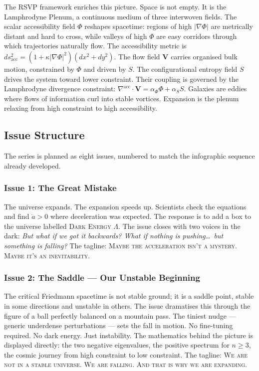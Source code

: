 \documentclass[12pt, a4paper]{article}
\begin{document}
The RSVP framework enriches this picture. Space is not empty. It is the Lamphrodyne Plenum, a continuous medium of three interwoven fields. The scalar accessibility field $\Phi$ reshapes spacetime: regions of high $|\nabla\Phi|$ are metrically distant and hard to cross, while valleys of high $\Phi$ are easy corridors through which trajectories naturally flow. The accessibility metric is $ds^2_{\text{acc}} = (1 + \kappa|\nabla\Phi|^2)(dx^2 + dy^2)$. The flow field $\mathbf{V}$ carries organised bulk motion, constrained by $\Phi$ and driven by $S$. The configurational entropy field $S$ drives the system toward lower constraint. Their coupling is governed by the Lamphrodyne divergence constraint: $\nabla^{\text{acc}} \cdot \mathbf{V} = \alpha_\Phi \Phi + \alpha_S S$. Galaxies are eddies where flows of information curl into stable vortices. Expansion is the plenum relaxing from high constraint to high accessibility.

\subsection{Issue Structure}

The series is planned as eight issues, numbered to match the infographic sequence already developed.

\subsubsection{Issue 1: The Great Mistake}

The universe expands. The expansion speeds up. Scientists check the equations and find $\ddot{a} > 0$ where deceleration was expected. The response is to add a box to the universe labelled \textsc{Dark Energy} $\Lambda$. The issue closes with two voices in the dark: \textit{But what if we got it backwards? What if nothing is pushing\ldots\ but something is falling?} The tagline: \textsc{Maybe the acceleration isn't a mystery. Maybe it's an inevitability.}

\subsubsection{Issue 2: The Saddle --- Our Unstable Beginning}

The critical Friedmann spacetime is not stable ground; it is a saddle point, stable in some directions and unstable in others. The issue dramatises this through the figure of a ball perfectly balanced on a mountain pass. The tiniest nudge --- generic underdense perturbations --- sets the fall in motion. No fine-tuning required. No dark energy. Just instability. The mathematics behind the picture is displayed directly: the two negative eigenvalues, the positive spectrum for $n \geq 3$, the cosmic journey from high constraint to low constraint. The tagline: \textsc{We are not in a stable universe. We are falling. And that is why we are expanding.}
\end{document}
